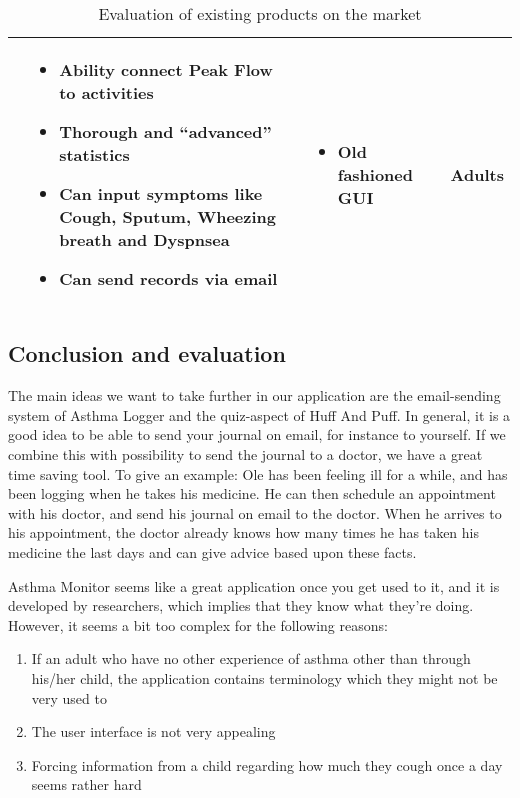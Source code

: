 \begin{sidewaystable}
\begin{tabular}{ | p{4.0cm} | p{5.5cm} | p{5.5cm} | p{4cm}|}
	&
	\begin{itemize}
	  \item Ability connect Peak Flow to activities
	  \item Thorough and ``advanced'' statistics
	  \item Can input symptoms like Cough, Sputum, Wheezing breath and Dyspnsea 
	  \item Can send records via email
	\end{itemize}
	&
	\begin{itemize}
	  \item Old fashioned GUI
	\end{itemize}
	& 
	Adults
	\\ \hline
	\end{tabular}
	\caption{Evaluation of existing products on the market}
\end{sidewaystable}

\subsection{Conclusion and evaluation}
\label{sec:existingconcl}

The main ideas we want to take further in our application are the email-sending system of Asthma Logger and the quiz-aspect of Huff And Puff. In general, it is a good idea to be able to send your journal on email, for instance to yourself. If we combine this with possibility to send the journal to a doctor, we have a great time saving tool. To give an example: Ole has been feeling ill for a while, and has been logging when he takes his medicine. He can then schedule an appointment with his doctor, and send his journal on email to the doctor. When he arrives to his appointment, the doctor already knows how many times he has taken his medicine the last days and can give advice based upon these facts. 

Asthma Monitor seems like a great application once you get used to it, and it is developed by researchers, which implies that they know what they're doing. However, it seems a bit too complex for the following reasons:
\begin{enumerate}
  \item If an adult who have no other experience of asthma other than through his/her child, the application contains terminology which they might not be very used to
  \item The user interface is not very appealing
  \item Forcing information from a child regarding how much they cough once a day seems rather hard 
\end{enumerate}   

